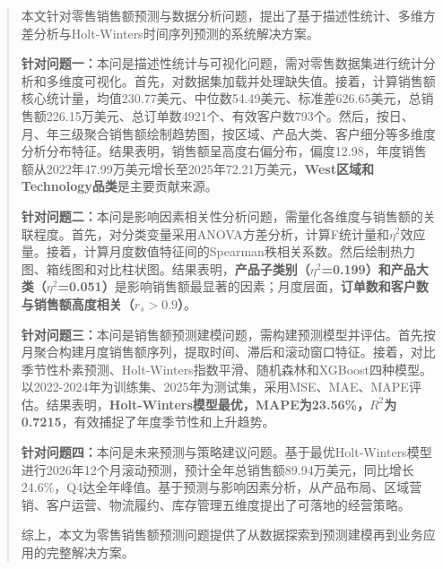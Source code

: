

\begin{abstract}
本文针对零售销售额预测与数据分析问题，提出了基于描述性统计、多维方差分析与Holt-Winters时间序列预测的系统解决方案。

\textbf{针对问题一：}本问是描述性统计与可视化问题，需对零售数据集进行统计分析和多维度可视化。首先，对数据集加载并处理缺失值。接着，计算销售额核心统计量，均值230.77美元、中位数54.49美元、标准差626.65美元，总销售额226.15万美元、总订单数4921个、有效客户数793个。然后，按日、月、年三级聚合销售额绘制趋势图，按区域、产品大类、客户细分等多维度分析分布特征。结果表明，销售额呈高度右偏分布，偏度12.98，年度销售额从2022年47.99万美元增长至2025年72.21万美元，\textbf{West区域和Technology品类}是主要贡献来源。

\textbf{针对问题二：}本问是影响因素相关性分析问题，需量化各维度与销售额的关联程度。首先，对分类变量采用ANOVA方差分析，计算F统计量和$\eta^2$效应量。接着，计算月度数值特征间的Spearman秩相关系数。然后绘制热力图、箱线图和对比柱状图。结果表明，\textbf{产品子类别（$\eta^2$=0.199）和产品大类（$\eta^2$=0.051）}是影响销售额最显著的因素；月度层面，\textbf{订单数和客户数与销售额高度相关（$r_s>0.9$）}。

\textbf{针对问题三：}本问是销售额预测建模问题，需构建预测模型并评估。首先按月聚合构建月度销售额序列，提取时间、滞后和滚动窗口特征。接着，对比季节性朴素预测、Holt-Winters指数平滑、随机森林和XGBoost四种模型。以2022-2024年为训练集、2025年为测试集，采用MSE、MAE、MAPE评估。结果表明，\textbf{Holt-Winters模型最优，MAPE为23.56\%，$R^2$为0.7215}，有效捕捉了年度季节性和上升趋势。

\textbf{针对问题四：}本问是未来预测与策略建议问题。基于最优Holt-Winters模型进行2026年12个月滚动预测，预计全年总销售额89.94万美元，同比增长24.6\%，Q4达全年峰值。基于预测与影响因素分析，从产品布局、区域营销、客户运营、物流履约、库存管理五维度提出了可落地的经营策略。

综上，本文为零售销售额预测问题提供了从数据探索到预测建模再到业务应用的完整解决方案。

\label{abstract:end}
\end{abstract}
